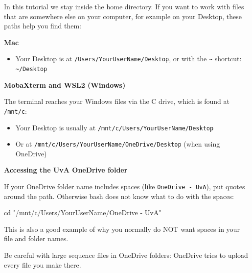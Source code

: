 \documentclass[
  letterpaper,
  DIV=11,
  numbers=noendperiod]{scrreprt}
\newenvironment{Shaded}{}{}
\newcommand{\BuiltInTok}[1]{\textcolor[rgb]{0.84,0.23,0.29}{#1}}
\newcommand{\StringTok}[1]{\textcolor[rgb]{0.01,0.18,0.38}{#1}}
\providecommand{\tightlist}{%
  \setlength{\itemsep}{0pt}\setlength{\parskip}{0pt}}
\begin{document}
\begin{tcolorbox}[enhanced jigsaw, coltitle=black, breakable, titlerule=0mm, colback=white, rightrule=.15mm, bottomrule=.15mm, toprule=.15mm, colframe=quarto-callout-tip-color-frame, colbacktitle=quarto-callout-tip-color!10!white, bottomtitle=1mm, opacitybacktitle=0.6, toptitle=1mm, leftrule=.75mm, arc=.35mm, title=\textcolor{quarto-callout-tip-color}{\faLightbulb}\hspace{0.5em}{Tip: Finding your Desktop and OneDrive folders (optional)}, left=2mm, opacityback=0]

In this tutorial we stay inside the home directory. If you want to work
with files that are somewhere else on your computer, for example on your
Desktop, these paths help you find them:

\textbf{Mac}

\begin{itemize}
\tightlist
\item
  Your Desktop is at \texttt{/Users/YourUserName/Desktop}, or with the
  \texttt{\textasciitilde{}} shortcut:
  \texttt{\textasciitilde{}/Desktop}
\end{itemize}

\textbf{MobaXterm and WSL2 (Windows)}

The terminal reaches your Windows files via the C drive, which is found
at \texttt{/mnt/c}:

\begin{itemize}
\tightlist
\item
  Your Desktop is usually at \texttt{/mnt/c/Users/YourUserName/Desktop}
\item
  Or at \texttt{/mnt/c/Users/YourUserName/OneDrive/Desktop} (when using
  OneDrive)
\end{itemize}

\textbf{Accessing the UvA OneDrive folder}

If your OneDrive folder name includes spaces (like
\texttt{OneDrive\ -\ UvA}), put quotes around the path. Otherwise bash
does not know what to do with the spaces:

\begin{Shaded}
\begin{Highlighting}[]
\BuiltInTok{cd} \StringTok{"/mnt/c/Users/YourUserName/OneDrive {-} UvA"}
\end{Highlighting}
\end{Shaded}

This is also a good example of why you normally do NOT want spaces in
your file and folder names.

Be careful with large sequence files in OneDrive folders: OneDrive tries
to upload every file you make there.

\end{tcolorbox}
\end{document}
